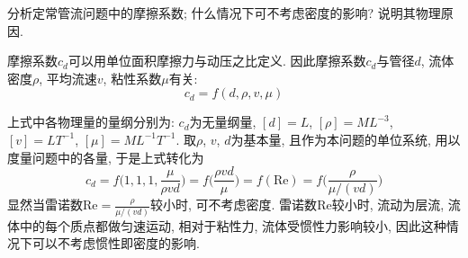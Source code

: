 \begin{problem}[11]
分析定常管流问题中的摩擦系数; 什么情况下可不考虑密度的影响? 说明其物理原因.
\end{problem}
\begin{solution}
\begin{minipage}[c]{0.8\linewidth}
摩擦系数$c_d$可以用单位面积摩擦力与动压之比定义. 因此摩擦系数$c_d$与管径$d$, 流体密度$\rho$, 平均流速$v$, 粘性系数$\mu$有关:
\[
c_d = f(d,\rho, v, \mu)
\]
\end{minipage}
\begin{minipage}[c]{0.2\linewidth}
\begin{center}

\end{center}
\end{minipage}
上式中各物理量的量纲分别为: $c_d$为无量纲量, $[d]=L$, $[\rho]=ML^{-3}$, $[v]=LT^{-1}$, $[\mu]=ML^{-1}T^{-1}$. 取$\rho$, $v$, $d$为基本量, 且作为本问题的单位系统, 用以度量问题中的各量, 于是上式转化为
\[
c_d = f\bigg(1,1,1,\frac{\mu}{\rho v d}\bigg) = f\bigg(\frac{\rho v d}{\mu}\bigg)=f(\mathrm{Re})
=f\bigg(\frac{\rho}{\mu/(vd)}\bigg)\]
显然当雷诺数$\mathrm{Re}=\frac{\rho}{\mu/(vd)}$较小时, 可不考虑密度. 雷诺数$\mathrm{Re}$较小时, 流动为层流, 流体中的每个质点都做匀速运动, 相对于粘性力, 流体受惯性力影响较小, 因此这种情况下可以不考虑惯性即密度的影响.
\end{solution}

